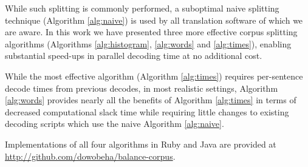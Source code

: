 \documentclass{pbml}
\begin{document}
While such splitting is commonly performed, a suboptimal naive splitting technique (Algorithm \ref{alg:naive}) is used by all translation software of which we are aware. 
%
In this work we have presented three more effective corpus splitting algorithms (Algorithms \ref{alg:histogram}, \ref{alg:words} and \ref{alg:times}), 
% 
enabling substantial speed-ups in parallel decoding time at no additional cost.

While the most effective algorithm (Algorithm \ref{alg:times}) requires per-sentence decode times from previous decodes, in most realistic settings, Algorithm \ref{alg:words} provides nearly all the benefits of Algorithm \ref{alg:times} in terms of decreased computational slack time while requiring little changes to existing decoding scripts which use the naive Algorithm \ref{alg:naive}.


Implementations of all four algorithms in Ruby and Java are provided at \url{http://github.com/dowobeha/balance-corpus}.





















\clearpage
{}


\end{document}
